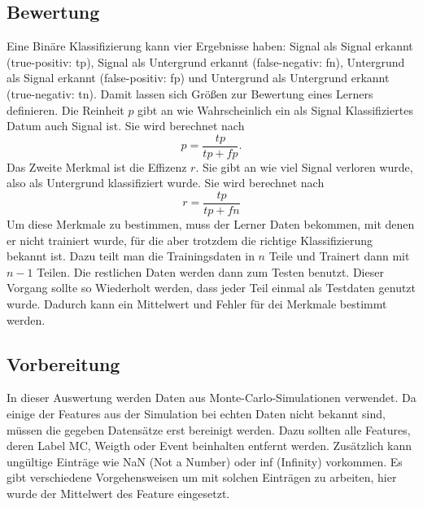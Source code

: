 \subsection{Bewertung}
Eine Binäre Klassifizierung kann vier Ergebnisse haben: Signal als Signal erkannt (true-positiv: tp), Signal als Untergrund erkannt (false-negativ: fn),
Untergrund als Signal erkannt (false-positiv: fp) und Untergrund als Untergrund erkannt (true-negativ: tn). Damit lassen sich Größen zur Bewertung eines
Lerners definieren. Die Reinheit $p$ gibt an wie Wahrscheinlich ein als Signal Klassifiziertes Datum auch Signal ist. Sie wird berechnet nach
\begin{equation}
	p=\frac{tp}{tp+fp}.
\end{equation}
Das Zweite Merkmal ist die Effizenz $r$. Sie gibt an wie viel Signal verloren wurde, also als Untergrund klassifiziert wurde. Sie wird berechnet nach
\begin{equation}
	r=\frac{tp}{tp+fn}
\end{equation}
Um diese Merkmale zu bestimmen, muss der Lerner Daten bekommen, mit denen er nicht trainiert wurde, für die aber trotzdem die richtige Klassifizierung bekannt
ist. Dazu teilt man die Trainingsdaten in $n$ Teile und Trainert dann mit $n-1$ Teilen. Die restlichen Daten werden dann zum Testen benutzt. Dieser Vorgang
sollte so Wiederholt werden, dass jeder Teil einmal als Testdaten genutzt wurde. Dadurch kann ein Mittelwert und Fehler für dei Merkmale bestimmt werden.
\subsection{Vorbereitung}
In dieser Auswertung werden Daten aus Monte-Carlo-Simulationen verwendet. Da einige der Features aus der Simulation bei echten Daten nicht bekannt sind, müssen
die gegeben Datensätze erst bereinigt werden. Dazu sollten alle Features, deren Label MC, Weigth oder Event beinhalten entfernt werden. Zusätzlich kann
ungültige Einträge wie NaN (Not a Number) oder inf (Infinity) vorkommen. Es gibt verschiedene Vorgehensweisen um mit solchen Einträgen zu arbeiten, hier wurde
der Mittelwert des Feature eingesetzt.
